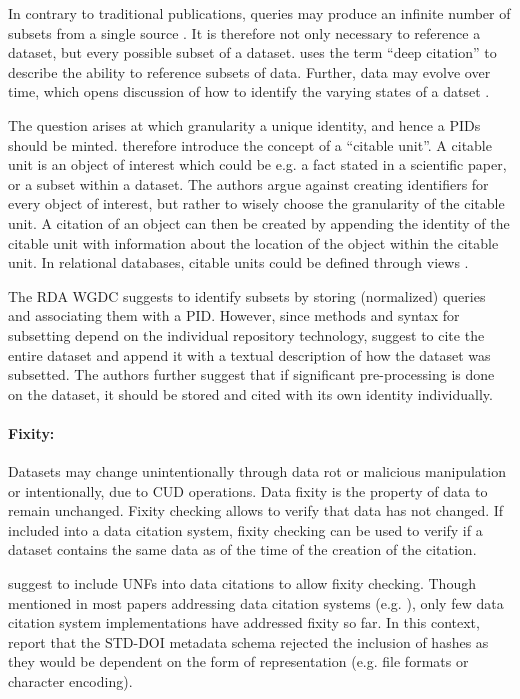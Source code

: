 \documentclass[a4paper,10pt]{article}
\begin{document}
In contrary to traditional publications, queries may produce an infinite number of subsets from a single source \citep{Davidson2017, CODATA2013}. It is therefore not only necessary to reference a dataset, but every possible subset of a dataset. \cite{AltKin07} uses the term ``deep citation'' to describe the ability to reference subsets of data. 
Further, data may evolve over time, which opens discussion of how to identify the varying states of a datset \citep{Huber2015}.

The question arises at which granularity a unique identity, and hence a \glspl{PID} should be minted. \cite{Buneman2010} therefore introduce the concept of a ``citable unit''. A citable unit is an object of interest which could be e.g. a fact stated in a scientific paper, or a subset within a dataset. The authors argue against creating identifiers for every object of interest, but rather to wisely choose the granularity of the citable unit. A citation of an object can then be created by appending the identity of the citable unit with information about the location of the object within the citable unit. In relational databases, citable units could be defined through views \citep{Buneman2016}.

The \gls{RDA} \gls{WGDC} \citep{Rauber2015a, Rauber2015, Proll2013} suggests to identify subsets by storing (normalized) queries and associating them with a \gls{PID}. However, since methods and syntax for subsetting depend on the individual repository technology, \cite{AltKin07} suggest to cite the entire dataset and append it with a textual description of how the dataset was subsetted. The authors further suggest that if significant pre-processing is done on the dataset, it should be stored and cited with its own identity individually. 

\paragraph{Fixity:}
Datasets may change unintentionally through data rot or malicious manipulation or intentionally, due to \gls{CUD} operations. 
Data fixity is the property of data to remain unchanged. 
Fixity checking allows to verify that data has not changed.
If included into a data citation system, fixity checking can be used to verify if a dataset contains the same data as of the time of the creation of the citation.

\cite{AltKin07, Rauber2015} suggest to include \glspl{UNF} into data citations to allow fixity checking. Though mentioned in most papers addressing data citation systems (e.g. \citep{Buneman2016, Davidson2017}), only few data citation system implementations have addressed fixity so far. In this context, \cite{Klump2016} report that the STD-DOI metadata schema rejected the inclusion of hashes as they would be dependent on the form of representation (e.g. file formats or character encoding).
\end{document}

